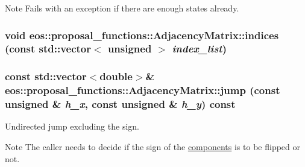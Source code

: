 \begin{DoxyNote}{Note}
Fails with an exception if there are enough states already. 
\end{DoxyNote}
\hypertarget{classeos_1_1proposal__functions_1_1AdjacencyMatrix_a0578ba400c8091d18f265683de1e801e}{
\subsubsection[{indices}]{\setlength{\rightskip}{0pt plus 5cm}void eos::proposal\_\-functions::AdjacencyMatrix::indices (const std::vector$<$ unsigned $>$ {\em index\_\-list})}}
\label{classeos_1_1proposal__functions_1_1AdjacencyMatrix_a0578ba400c8091d18f265683de1e801e}
\hypertarget{classeos_1_1proposal__functions_1_1AdjacencyMatrix_ac32923bdb581f366d9516d0a80e1fa22}{
\subsubsection[{jump}]{\setlength{\rightskip}{0pt plus 5cm}const std::vector$<$double$>$\& eos::proposal\_\-functions::AdjacencyMatrix::jump (const unsigned \& {\em h\_\-x}, \/  const unsigned \& {\em h\_\-y}) const}}
\label{classeos_1_1proposal__functions_1_1AdjacencyMatrix_ac32923bdb581f366d9516d0a80e1fa22}
Undirected jump excluding the sign.

\begin{DoxyNote}{Note}
The caller needs to decide if the sign of the \hyperlink{namespaceeos_1_1components}{components} is to be flipped or not.
\end{DoxyNote}

